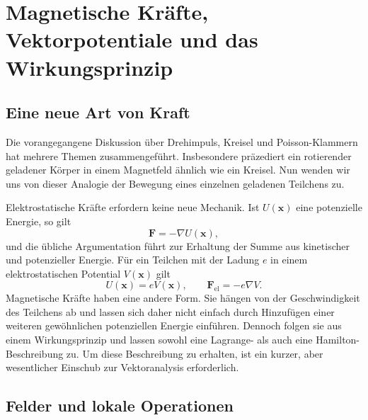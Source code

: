 \chapter{Magnetische Kräfte, Vektorpotentiale und das Wirkungsprinzip}


\section{Eine neue Art von Kraft}

Die vorangegangene Diskussion über Drehimpuls, Kreisel und Poisson-Klammern hat mehrere Themen zusammengeführt. Insbesondere präzediert ein rotierender geladener Körper in einem Magnetfeld ähnlich wie ein Kreisel. Nun wenden wir uns von dieser Analogie der Bewegung eines einzelnen geladenen Teilchens zu.

Elektrostatische Kräfte erfordern keine neue Mechanik. Ist \(U(\mathbf x)\) eine potenzielle Energie, so gilt
\begin{equation}
  \mathbf F=-\nabla U(\mathbf x),
\end{equation}
und die übliche Argumentation führt zur Erhaltung der Summe aus kinetischer und potenzieller Energie. Für ein Teilchen mit der Ladung \(e\) in einem elektrostatischen Potential \(V(\mathbf x)\) gilt
\begin{equation}
  U(\mathbf x)=eV(\mathbf x),
  \qquad
  \mathbf F_{\mathrm{el}}=-e\nabla V.
\end{equation}
Magnetische Kräfte haben eine andere Form. Sie hängen von der Geschwindigkeit des Teilchens ab und lassen sich daher nicht einfach durch Hinzufügen einer weiteren gewöhnlichen potenziellen Energie einführen. Dennoch folgen sie aus einem Wirkungsprinzip und lassen sowohl eine Lagrange- als auch eine Hamilton-Beschreibung zu. Um diese Beschreibung zu erhalten, ist ein kurzer, aber wesentlicher Einschub zur Vektoranalysis erforderlich.

\section{Felder und lokale Operationen}

